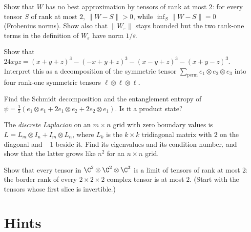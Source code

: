 \begin{exercise}[$\star$]\label{ex:noapprox}
Show that $W$ has no best approximation by tensors of rank at most $2$: for every tensor $S$ of rank at most $2$, $\|W-S\|>0$, while
$\inf_S\|W-S\|=0$ (Frobenius norms). Show also that $\|W_\varepsilon\|$ stays bounded but the two rank-one terms in the definition of
$W_\varepsilon$ have norm $1/\varepsilon$.
\end{exercise}

\begin{exercise}[$\star\star$]\label{ex:waring}
Show that $24xyz=(x+y+z)^3-(-x+y+z)^3-(x-y+z)^3-(x+y-z)^3$. Interpret this as a decomposition of the symmetric tensor
$\sum_{\text{perm}}e_1\otimes e_2\otimes e_3$ into four rank-one symmetric tensors $\ell\otimes\ell\otimes\ell$.
\end{exercise}

\begin{exercise}[$\star$]\label{ex:schmidtcheck}
Find the Schmidt decomposition and the entanglement entropy of $\psi=\frac13(e_1\otimes e_1+2e_1\otimes e_2+2e_2\otimes e_1)$. Is it a
product state?
\end{exercise}

\begin{exercise}[$\star\star$]\label{ex:gridlap}
The \emph{discrete Laplacian} on an $m\times n$ grid with zero boundary values is $L=L_m\otimes I_n+I_m\otimes L_n$, where $L_k$ is the
$k\times k$ tridiagonal matrix with $2$ on the diagonal and $-1$ beside it. Find its eigenvalues and its condition number, and show that
the latter grows like $n^2$ for an $n\times n$ grid.
\end{exercise}

\begin{exercise}[$\star\star\star$]\label{ex:border}
Show that every tensor in $\C^2\otimes\C^2\otimes\C^2$ is a limit of tensors of rank at most $2$: the border rank of every
$2\times2\times2$ complex tensor is at most $2$. (Start with the tensors whose first slice is invertible.)
\end{exercise}

\section{Hints}

